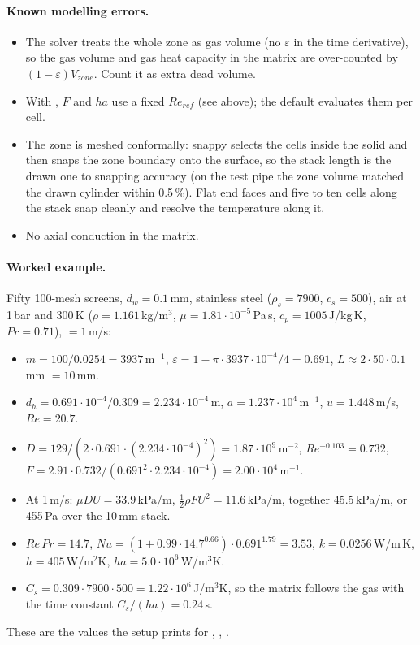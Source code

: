 \paragraph{Known modelling errors.}
\begin{itemize}
    \item The solver treats the whole zone as gas volume (no $\varepsilon$ in the time derivative), so the gas volume and gas heat capacity in the matrix are over-counted by $(1-\varepsilon) V_{zone}$. Count it as extra dead volume.
    \item With , $F$ and $h a$ use a fixed $Re_{ref}$ (see above); the default  evaluates them per cell.
    \item The zone is meshed conformally: snappy selects the cells inside the  solid and then snaps the zone boundary onto the surface, so the stack length is the drawn one to snapping accuracy (on the test pipe the zone volume matched the drawn cylinder within 0.5\,\%). Flat end faces and five to ten cells along the stack snap cleanly and resolve the temperature along it.
    \item No axial conduction in the matrix.
\end{itemize}

\paragraph{Worked example.}
Fifty 100-mesh screens, $d_w = 0.1$\,mm, stainless steel ($\rho_s = 7900$, $c_s = 500$), air at 1\,bar and 300\,K ($\rho = 1.161$\,kg/m$^3$, $\mu = 1.81\cdot10^{-5}$\,Pa\,s, $c_p = 1005$\,J/kg\,K, $Pr = 0.71$),  $= 1$\,m/s:
\begin{itemize}
    \item $m = 100/0.0254 = 3937$\,m$^{-1}$, $\varepsilon = 1 - \pi \cdot 3937 \cdot 10^{-4}/4 = 0.691$, $L \approx 2 \cdot 50 \cdot 0.1$\,mm $= 10$\,mm.
    \item $d_h = 0.691 \cdot 10^{-4}/0.309 = 2.234\cdot10^{-4}$\,m, $a = 1.237\cdot10^{4}$\,m$^{-1}$, $u = 1.448$\,m/s, $Re = 20.7$.
    \item $D = 129/(2 \cdot 0.691 \cdot (2.234\cdot10^{-4})^2) = 1.87\cdot10^{9}$\,m$^{-2}$, $Re^{-0.103} = 0.732$, $F = 2.91 \cdot 0.732/(0.691^2 \cdot 2.234\cdot10^{-4}) = 2.00\cdot10^{4}$\,m$^{-1}$.
    \item At 1\,m/s: $\mu D U = 33.9$\,kPa/m, $\frac{1}{2}\rho F U^2 = 11.6$\,kPa/m, together 45.5\,kPa/m, or 455\,Pa over the 10\,mm stack.
    \item $Re\,Pr = 14.7$, $Nu = (1 + 0.99 \cdot 14.7^{0.66}) \cdot 0.691^{1.79} = 3.53$, $k = 0.0256$\,W/m\,K, $h = 405$\,W/m$^2$K, $h a = 5.0\cdot10^{6}$\,W/m$^3$K.
    \item $C_s = 0.309 \cdot 7900 \cdot 500 = 1.22\cdot10^{6}$\,J/m$^3$K, so the matrix follows the gas with the time constant $C_s/(h a) = 0.24$\,s.
\end{itemize}
These are the values the setup prints for , , .

